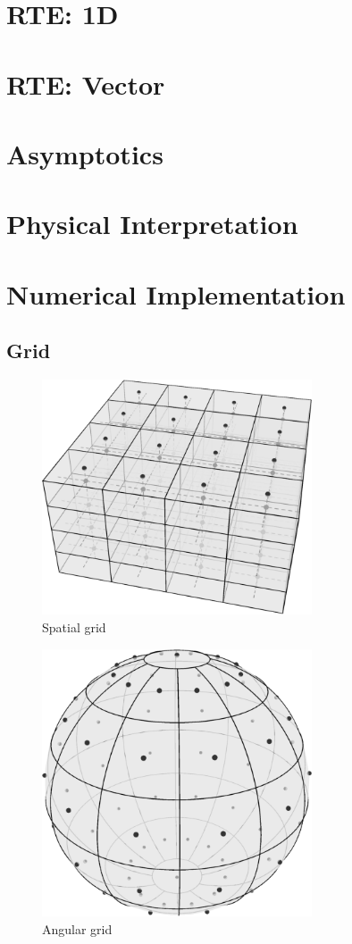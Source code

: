\documentclass{article}
\begin{document}
\section{RTE: 1D}

\section{RTE: Vector}

\section{Asymptotics}

\section{Physical Interpretation}

\section{Numerical Implementation}
\subsection{Grid}

\begin{figure}
  \includegraphics[width=8cm]{spatialgrid}
  \caption{Spatial grid}
\end{figure}

\begin{figure}
  \includegraphics[width=8cm]{angulargrid}
  \caption{Angular grid}
\end{figure}
\end{document}
